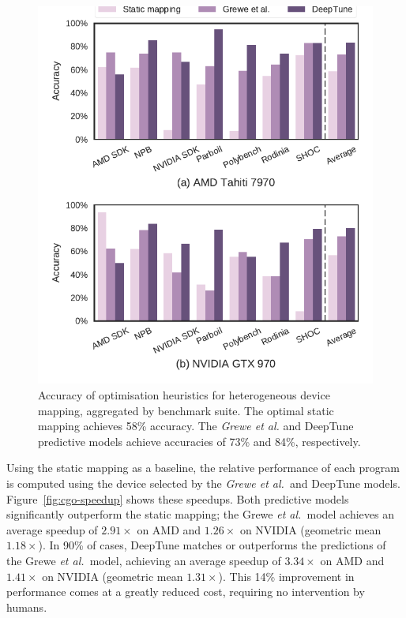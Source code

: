 \begin{figure}
	\centering %
	\includegraphics[width=.85\columnwidth]{img/cgo-acc}%
	\caption[Accuracy of optimisation heuristics for heterogeneous device mapping]{%
		Accuracy of optimisation heuristics for heterogeneous device mapping, aggregated by benchmark suite. The optimal static mapping achieves 58\% accuracy. The \emph{Grewe et al. }and DeepTune predictive models achieve accuracies of 73\% and 84\%, respectively.%
	}
	\label{fig:cgo-accuracy}
\end{figure}

Using the static mapping as a baseline, the relative performance of each program is computed using the device selected by the \emph{Grewe et al.\ }and DeepTune models. Figure~\ref{fig:cgo-speedup} shows these speedups. Both predictive models significantly outperform the static mapping; the Grewe \emph{et al.\ }model achieves an average speedup of $2.91\times$ on AMD and $1.26\times$ on NVIDIA (geometric mean $1.18\times$). In 90\% of cases, DeepTune matches or outperforms the predictions of the Grewe \emph{et al.\ }model, achieving an average speedup of $3.34\times$ on AMD and $1.41\times$ on NVIDIA (geometric mean $1.31\times$). This 14\% improvement in performance comes at a greatly reduced cost, requiring no intervention by humans.

